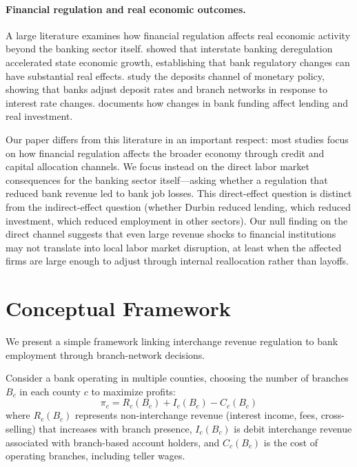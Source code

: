 \documentclass[12pt]{article}
\begin{document}
\paragraph{Financial regulation and real economic outcomes.} A large literature examines how financial regulation affects real economic activity beyond the banking sector itself. \citet{jayaratne1996} showed that interstate banking deregulation accelerated state economic growth, establishing that bank regulatory changes can have substantial real effects. \citet{drechsler2017} study the deposits channel of monetary policy, showing that banks adjust deposit rates and branch networks in response to interest rate changes. \citet{jiang2020} documents how changes in bank funding affect lending and real investment.

Our paper differs from this literature in an important respect: most studies focus on how financial regulation affects the broader economy through credit and capital allocation channels. We focus instead on the direct labor market consequences for the banking sector itself---asking whether a regulation that reduced bank revenue led to bank job losses. This direct-effect question is distinct from the indirect-effect question (whether Durbin reduced lending, which reduced investment, which reduced employment in other sectors). Our null finding on the direct channel suggests that even large revenue shocks to financial institutions may not translate into local labor market disruption, at least when the affected firms are large enough to adjust through internal reallocation rather than layoffs.


\section{Conceptual Framework}\label{sec:framework}

We present a simple framework linking interchange revenue regulation to bank employment through branch-network decisions.

Consider a bank operating in multiple counties, choosing the number of branches $B_c$ in each county $c$ to maximize profits:
\begin{equation}
\pi_c = R_c(B_c) + I_c(B_c) - C_c(B_c)
\end{equation}
where $R_c(B_c)$ represents non-interchange revenue (interest income, fees, cross-selling) that increases with branch presence, $I_c(B_c)$ is debit interchange revenue associated with branch-based account holders, and $C_c(B_c)$ is the cost of operating branches, including teller wages.
\end{document}
